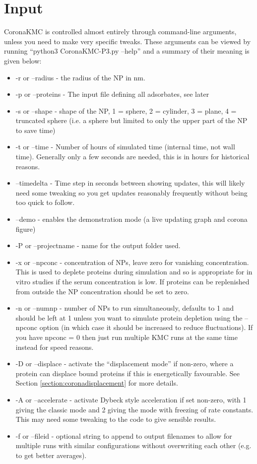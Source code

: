 \documentclass[10pt,a4paper,onecolumn]{report}
\begin{document}
 \section{Input}
CoronaKMC is controlled almost entirely through command-line arguments, unless you need to make very specific tweaks. These arguments can be viewed by running ``python3 CoronaKMC-P3.py --help'' and a summary of their meaning is given below:
 \begin{itemize}
 \item -r or --radius - the radius of the NP in nm. 
 \item -p or --proteins - The input file defining all adsorbates, see later
\item -s or --shape - shape of the NP,   1 = sphere, 2 = cylinder, 3 = plane, 4 = truncated sphere (i.e. a sphere but limited to only the upper part of the NP to save time)
\item -t or --time - Number of hours of simulated time (internal time, not wall time). Generally only a few seconds are needed, this is in hours for historical reasons.
\item --timedelta - Time step in seconds between showing updates, this will likely need some tweaking so you get updates reasonably frequently without being too quick to follow.
\item --demo - enables the demonstration mode (a live updating graph and corona figure)
\item -P or --projectname - name for the output folder used. 
\item -x or --npconc - concentration of NPs, leave zero for vanishing concentration. This is used to deplete proteins during simulation and so is appropriate for in vitro studies if the serum concentration is low. If proteins can be replenished from outside the NP concentration should be set to zero.
\item  -n or --numnp - number of NPs to run simultaneously, defaults to 1 and should be left at 1 unless you want to simulate protein depletion using the --npconc option (in which case it should be increased to reduce fluctuations). If you have npconc = 0 then just run multiple KMC runs at the same time instead for speed reasons.
\item  -D or --displace - activate the ``displacement mode'' if non-zero, where a protein can displace bound proteins if this is energetically favourable.  See Section \ref{section:coronadisplacement} for more details.
\item -A or --accelerate - activate Dybeck style acceleration if set non-zero, with 1 giving the classic mode and 2 giving the mode with freezing of rate constants. This may need some tweaking to the code to give sensible results. 
\item -f or --fileid - optional string to append to output filenames to allow for multiple runs with similar configurations without overwriting each other (e.g. to get better averages).
\end{itemize}
\end{document}
